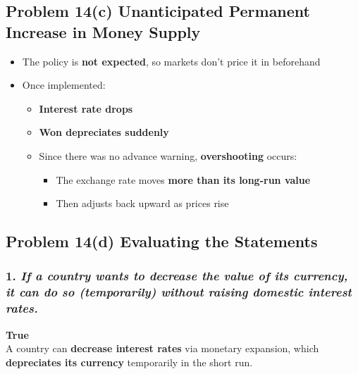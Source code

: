 \documentclass[
]{article}
\providecommand{\tightlist}{%
  \setlength{\itemsep}{0pt}\setlength{\parskip}{0pt}}
\begin{document}
\subsection{Problem 14(c) Unanticipated Permanent Increase in Money
Supply}\label{problem-14c-unanticipated-permanent-increase-in-money-supply}

\begin{itemize}
\tightlist
\item
  The policy is \textbf{not expected}, so markets don't price it in
  beforehand
\item
  Once implemented:

  \begin{itemize}
  \tightlist
  \item
    \textbf{Interest rate drops}
  \item
    \textbf{Won depreciates suddenly}
  \item
    Since there was no advance warning, \textbf{overshooting} occurs:

    \begin{itemize}
    \tightlist
    \item
      The exchange rate moves \textbf{more than its long-run value}
    \item
      Then adjusts back upward as prices rise
    \end{itemize}
  \end{itemize}
\end{itemize}

\subsection{Problem 14(d) Evaluating the
Statements}\label{problem-14d-evaluating-the-statements}

\subsubsection{\texorpdfstring{1. \emph{If a country wants to decrease
the value of its currency, it can do so (temporarily) without raising
domestic interest
rates.}}{1. If a country wants to decrease the value of its currency, it can do so (temporarily) without raising domestic interest rates.}}\label{if-a-country-wants-to-decrease-the-value-of-its-currency-it-can-do-so-temporarily-without-raising-domestic-interest-rates.}

\textbf{True}\\
A country can \textbf{decrease interest rates} via monetary expansion,
which \textbf{depreciates its currency} temporarily in the short run.
\end{document}
